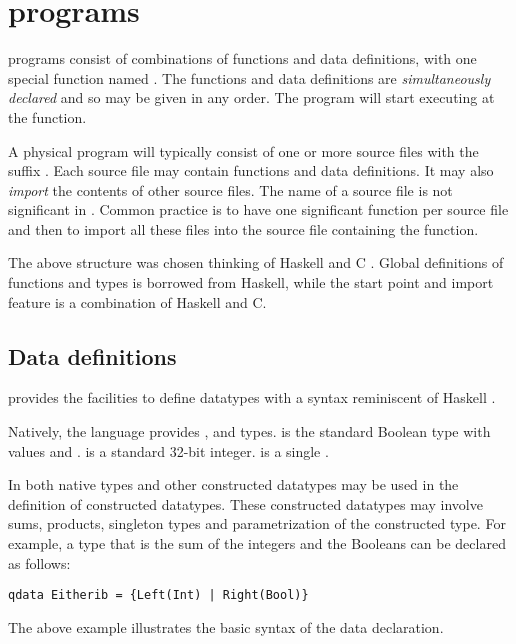\section{\lqpl{} programs}\label{sec:lqplprograms}
\lqpl{} programs  
consist of combinations of functions and data definitions, with 
one special function named . 
The functions and data definitions are
\emph{simultaneously declared} and  so may be 
given in any order. The program will start executing at the 
 function. 

A physical program will typically consist of one or more source files
with the suffix . Each source file may contain
functions and data definitions. It  may also
 \emph{import} the contents of other 
source files. The name of a source file is not significant in \lqpl. 
Common practice is to have one significant function per source file
and then to import all these files into the source file containing
the  function.

The above structure was chosen thinking of Haskell 
 \cite{peyton2003:haskell98} and C \cite{kernighan:c}. Global definitions 
of functions and types is borrowed from Haskell, while the  
start point and import feature is a combination of Haskell and C.

\subsection{Data definitions}\label{subsec:datadefinitions}
\lqpl{} provides the facilities to define  datatypes with 
a syntax reminiscent of Haskell \cite{peyton2003:haskell98}. 

Natively, the language provides , 
 and  
types.  is the standard Boolean  type with values
 and .  is a standard 32-bit
integer.  is a single \qubit{}.

In \lqpl{} both native types and other constructed datatypes may
be used in the definition of
constructed datatypes. These constructed datatypes may involve
 sums, products,
singleton types and parametrization of the constructed type.
For example, a type that is the sum of the integers and the Booleans
can be declared as  follows:
\begin{lstlisting}[style=linqplnonum]
        qdata Eitherib = {Left(Int) | Right(Bool)}
\end{lstlisting}
The above example illustrates the basic syntax of the 
data declaration. 

